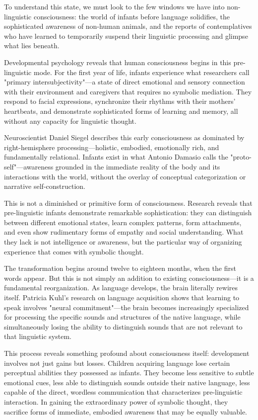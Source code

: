 To understand this state, we must look to the few windows we have into non-linguistic consciousness: the world of infants before language solidifies, the sophisticated awareness of non-human animals, and the reports of contemplatives who have learned to temporarily suspend their linguistic processing and glimpse what lies beneath.

Developmental psychology reveals that human consciousness begins in this pre-linguistic mode. For the first year of life, infants experience what researchers call "primary intersubjectivity"—a state of direct emotional and sensory connection with their environment and caregivers that requires no symbolic mediation. They respond to facial expressions, synchronize their rhythms with their mothers' heartbeats, and demonstrate sophisticated forms of learning and memory, all without any capacity for linguistic thought.

Neuroscientist Daniel Siegel describes this early consciousness as dominated by right-hemisphere processing—holistic, embodied, emotionally rich, and fundamentally relational. Infants exist in what Antonio Damasio calls the "proto-self"—awareness grounded in the immediate reality of the body and its interactions with the world, without the overlay of conceptual categorization or narrative self-construction.

This is not a diminished or primitive form of consciousness. Research reveals that pre-linguistic infants demonstrate remarkable sophistication: they can distinguish between different emotional states, learn complex patterns, form attachments, and even show rudimentary forms of empathy and social understanding. What they lack is not intelligence or awareness, but the particular way of organizing experience that comes with symbolic thought.

The transformation begins around twelve to eighteen months, when the first words appear. But this is not simply an addition to existing consciousness—it is a fundamental reorganization. As language develops, the brain literally rewires itself. Patricia Kuhl's research on language acquisition shows that learning to speak involves "neural commitment"—the brain becomes increasingly specialized for processing the specific sounds and structures of the native language, while simultaneously losing the ability to distinguish sounds that are not relevant to that linguistic system.

This process reveals something profound about consciousness itself: development involves not just gains but losses. Children acquiring language lose certain perceptual abilities they possessed as infants. They become less sensitive to subtle emotional cues, less able to distinguish sounds outside their native language, less capable of the direct, wordless communication that characterizes pre-linguistic interaction. In gaining the extraordinary power of symbolic thought, they sacrifice forms of immediate, embodied awareness that may be equally valuable.

